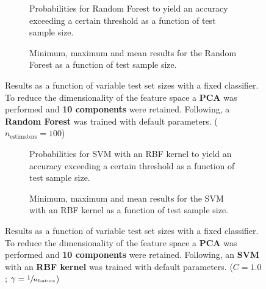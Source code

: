 \begin{figure}
    \captionsetup[subfigure]{justification=justified,singlelinecheck=false}
    \begin{subfigure}[t]{0.61\textwidth}
        
        \caption{Probabilities for Random Forest to yield an accuracy exceeding a certain threshold as a function of test sample size.}
    \end{subfigure}
    \hspace{3.0mm}
    \begin{subfigure}[t]{0.34\textwidth}
        
        \caption{Minimum, maximum and mean results for the Random Forest as a function of test sample size.}
    \end{subfigure}
    \caption[Effects of varying test sample size. Random Forest; Preprocessing: PCA ($n_\text{components} = \num{10}$)]{Results as a function of variable test set sizes with a fixed classifier. To reduce the dimensionality of the feature space a \textbf{PCA} was performed and \textbf{10 components} were retained. Following, a \textbf{{Random Forest}} was trained with default parameters. ($n_\text{estimators}=\num{100}$)}
    \label{fig:PCA_10_components_no_selection_RandomForest}
\end{figure}

\begin{figure}
    \captionsetup[subfigure]{justification=justified,singlelinecheck=false}
    \begin{subfigure}[t]{0.61\textwidth}
        
        \caption{Probabilities for SVM with an RBF kernel to yield an accuracy exceeding a certain threshold as a function of test sample size.}
    \end{subfigure}
    \hspace{3.0mm}
    \begin{subfigure}[t]{0.34\textwidth}
        
        \caption{Minimum, maximum and mean results for the SVM with an RBF kernel as a function of test sample size.}
    \end{subfigure}
    \caption[Effects of varying test sample size. SVM (kernel = RBF); Preprocessing: PCA ($n_\text{components} = \num{10}$)]{Results as a function of variable test set sizes with a fixed classifier. To reduce the dimensionality of the feature space a \textbf{PCA} was performed and \textbf{10 components} were retained. Following, an \textbf{{SVM}} with an \textbf{{RBF kernel}} was trained with default parameters. ($C=\num{1.0}$; $\gamma=\sfrac{1}{n_\text{feature}}$)}
    \label{fig:PCA_10_components_no_selection_SVC}
\end{figure}

